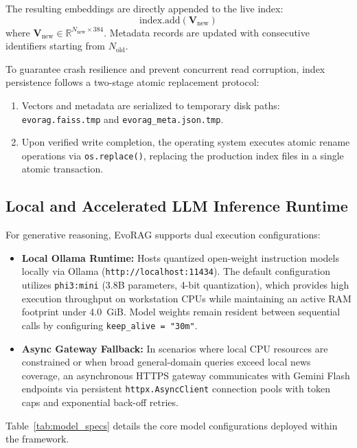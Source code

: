 The resulting embeddings are directly appended to the live index:
\begin{equation}
\text{index.add}(\mathbf{V}_{\text{new}})
\end{equation}
where $\mathbf{V}_{\text{new}} \in \mathbb{R}^{N_{\text{new}} \times 384}$. Metadata records are updated with consecutive identifiers starting from $N_{\text{old}}$.

To guarantee crash resilience and prevent concurrent read corruption, index persistence follows a two-stage atomic replacement protocol:
\begin{enumerate}
    \item Vectors and metadata are serialized to temporary disk paths: \texttt{evorag.faiss.tmp} and \texttt{evorag\_meta.json.tmp}.
    \item Upon verified write completion, the operating system executes atomic rename operations via \texttt{os.replace()}, replacing the production index files in a single atomic transaction.
\end{enumerate}

\subsection{Local and Accelerated LLM Inference Runtime}
For generative reasoning, EvoRAG supports dual execution configurations:
\begin{itemize}
    \item \textbf{Local Ollama Runtime:} Hosts quantized open-weight instruction models locally via Ollama (\texttt{http://localhost:11434}). The default configuration utilizes \texttt{phi3:mini} (3.8B parameters, 4-bit quantization), which provides high execution throughput on workstation CPUs while maintaining an active RAM footprint under 4.0~GiB. Model weights remain resident between sequential calls by configuring \texttt{keep\_alive = "30m"}.
    \item \textbf{Async Gateway Fallback:} In scenarios where local CPU resources are constrained or when broad general-domain queries exceed local news coverage, an asynchronous HTTPS gateway communicates with Gemini Flash endpoints via persistent \texttt{httpx.AsyncClient} connection pools with token caps and exponential back-off retries.
\end{itemize}

Table~\ref{tab:model_specs} details the core model configurations deployed within the framework.

